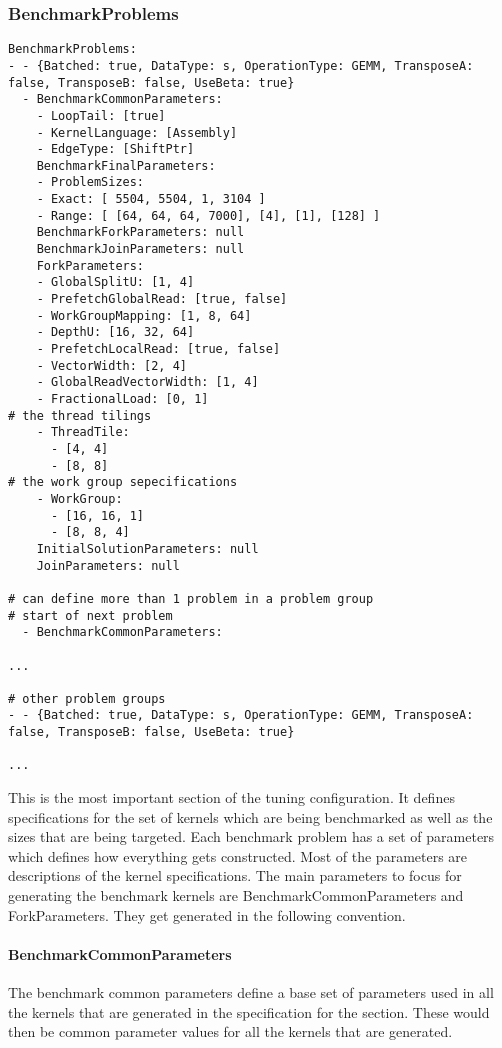 \documentclass[]{article}
\begin{document}
\subsubsection{BenchmarkProblems}
\begin{verbatim}
BenchmarkProblems:
- - {Batched: true, DataType: s, OperationType: GEMM, TransposeA: false, TransposeB: false, UseBeta: true}
  - BenchmarkCommonParameters:
    - LoopTail: [true]
    - KernelLanguage: [Assembly]
    - EdgeType: [ShiftPtr]
    BenchmarkFinalParameters: 
    - ProblemSizes:
    - Exact: [ 5504, 5504, 1, 3104 ]
    - Range: [ [64, 64, 64, 7000], [4], [1], [128] ]
    BenchmarkForkParameters: null
    BenchmarkJoinParameters: null
    ForkParameters:
    - GlobalSplitU: [1, 4]
    - PrefetchGlobalRead: [true, false]
    - WorkGroupMapping: [1, 8, 64]
    - DepthU: [16, 32, 64]
    - PrefetchLocalRead: [true, false]
    - VectorWidth: [2, 4]
    - GlobalReadVectorWidth: [1, 4]
    - FractionalLoad: [0, 1]
# the thread tilings
    - ThreadTile:
      - [4, 4]
      - [8, 8]
# the work group sepecifications
    - WorkGroup:
      - [16, 16, 1]
      - [8, 8, 4]
    InitialSolutionParameters: null
    JoinParameters: null

# can define more than 1 problem in a problem group
# start of next problem
  - BenchmarkCommonParameters:    
  
...

# other problem groups
- - {Batched: true, DataType: s, OperationType: GEMM, TransposeA: false, TransposeB: false, UseBeta: true}

...

\end{verbatim}

This is the most important section of the tuning configuration. It defines specifications for the set of kernels which are being benchmarked as well as the sizes that are being targeted. Each benchmark problem has a set of parameters which defines how everything gets constructed. Most of the parameters are descriptions of the kernel specifications. The main parameters to focus for generating the benchmark kernels are BenchmarkCommonParameters and ForkParameters. They get generated in the following convention.  

\paragraph{BenchmarkCommonParameters} The benchmark common parameters define a base set of parameters used in all the kernels that are generated in the specification for the section. These would then be common parameter values for all the kernels that are generated.
\end{document}
